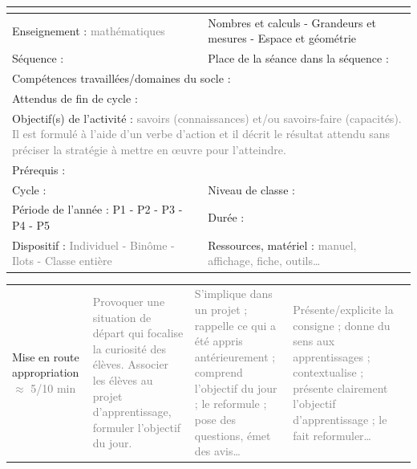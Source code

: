 {\small{}
\begin{tabular}{|p{8.1cm}|p{8.2cm}|}
   \hline
   \multicolumn{2}{|c|}{\cellcolor{FondTableaux}{\bf Titre de la séance}} \\
   \hline
   Enseignement : \textcolor{gray}{mathématiques} & {\footnotesize Nombres et calculs - Grandeurs et mesures - Espace et géométrie} \\
   Séquence : & Place de la séance dans la séquence : \\
   \hline
   \multicolumn{2}{|p{16.5cm}|}{Compétences travaillées/domaines du socle :} \\
   \multicolumn{2}{|p{16.5cm}|}{Attendus de fin de cycle :} \\
   \multicolumn{2}{|p{16.5cm}|}{Objectif(s) de l’activité : \textcolor{gray}{savoirs (connaissances) et/ou savoirs-faire (capacités). Il est formulé à l'aide d'un verbe d'action et il décrit le résultat attendu sans préciser la stratégie à mettre en œuvre pour l'atteindre.}} \\
   \multicolumn{2}{|p{16cm}|}{Prérequis : } \\
   \hline
   Cycle : & Niveau de classe : \\
   Période de l'année : \; P1 \; - \; P2 \; - \; P3 \; - \; P4 \; - \; P5 & Durée : \\
   \hline
   Dispositif : \textcolor{gray}{Individuel - Binôme - Ilots - Classe entière} & Ressources, matériel : \textcolor{gray}{manuel, affichage, fiche, outils\dots} \\
   \hline 
\end{tabular}
\begin{tabular}{|p{2cm}|p{3.25cm}|p{3.25cm}|p{3.25cm}|p{3.25cm}|}
   \hline
   \cellcolor{FondTableaux}{Phase} & \cellcolor{FondTableaux}{Objectifs} & \cellcolor{FondTableaux}{Activité élève} & \cellcolor{FondTableaux}{Activité enseignant(e)} & \cellcolor{FondTableaux}{Différentiation} \\
   \hline
   Mise en route appropriation \newline \textcolor{gray}{$\approx$ 5/10 min}
   &
   \textcolor{gray}{Provoquer une situation de départ qui focalise la curiosité des élèves. Associer les élèves au projet d’apprentissage, formuler l’objectif du jour.}
   &
   \textcolor{gray}{S’implique dans un projet ; rappelle ce qui a été appris antérieurement ; comprend l’objectif du jour ; le reformule ; pose des questions, émet des avis\dots}
   &
   \textcolor{gray}{Présente/explicite la consigne ; donne du sens aux apprentissages ; contextualise ; présente clairement l’objectif d’apprentissage ; le fait reformuler\dots}

\end{tabular}}
